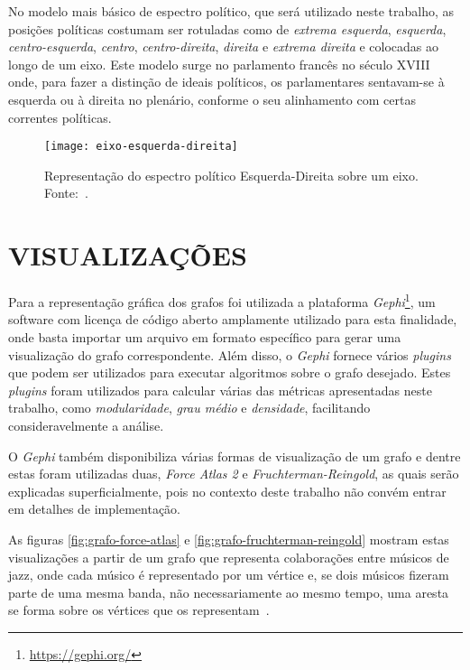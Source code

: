 No modelo mais básico de espectro político, que será utilizado neste trabalho, as posições políticas costumam ser rotuladas como de \emph{extrema esquerda}, \emph{esquerda}, \emph{centro-esquerda}, \emph{centro}, \emph{centro-direita}, \emph{direita} e \emph{extrema direita} e colocadas ao longo de um eixo. Este modelo surge no parlamento francês no século XVIII onde, para fazer a distinção de ideais políticos, os parlamentares sentavam-se à esquerda ou à direita no plenário, conforme o seu alinhamento com certas correntes políticas.

\begin{figure}[H]
\texttt{[image: eixo-esquerda-direita]}
\centering
\caption{
    Representação do espectro político Esquerda-Direita sobre um eixo. Fonte:~\cite{matos2016esquerdadireita}.
}
\label{fig:eixo-esquerda-direita}
\end{figure}



\section{\texorpdfstring{\MakeUppercase{Visualizações}}{}}
\label{conceitos__visualizacoes}

Para a representação gráfica dos grafos foi utilizada a plataforma \emph{Gephi}\footnote{\url{https://gephi.org/}}, um software com licença de código aberto amplamente utilizado para esta finalidade, onde basta importar um arquivo em formato específico para gerar uma visualização do grafo correspondente. Além disso, o \emph{Gephi} fornece vários \emph{plugins} que podem ser utilizados para executar algoritmos sobre o grafo desejado. Estes \emph{plugins} foram utilizados para calcular várias das métricas apresentadas neste trabalho, como \emph{modularidade}, \emph{grau médio} e \emph{densidade}, facilitando consideravelmente a análise.

O \emph{Gephi} também disponibiliza várias formas de visualização de um grafo e dentre estas foram utilizadas duas, \emph{Force Atlas 2} e \emph{Fruchterman-Reingold}, as quais serão explicadas superficialmente, pois no contexto deste trabalho não convém entrar em detalhes de implementação.

As figuras \ref{fig:grafo-force-atlas} e \ref{fig:grafo-fruchterman-reingold} mostram estas visualizações a partir de um grafo que representa colaborações entre músicos de jazz, onde cada músico é representado por um vértice e, se dois músicos fizeram parte de uma mesma banda, não necessariamente ao mesmo tempo, uma aresta se forma sobre os vértices que os representam~\cite{gleiser2003list}.

